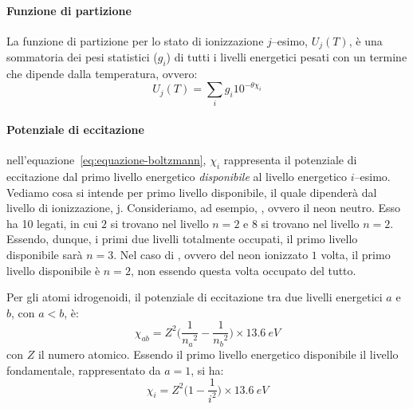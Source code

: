 \paragraph{Funzione di partizione}
La funzione di partizione per lo stato di ionizzazione $j$--esimo, ${U_j}(T)$, è una sommatoria dei pesi statistici ($g_i$) di tutti i livelli energetici pesati con un termine che dipende dalla temperatura, ovvero:
\begin{equation*}
    {U_j}(T) = \sum_i g_i 10^{-\theta \chi_i}
\end{equation*}

\paragraph{Potenziale di eccitazione}
nell'equazione~\eqref{eq:equazione-boltzmann}, $\chi_i$ rappresenta il potenziale di eccitazione dal primo livello energetico \emph{disponibile} al livello energetico $i$--esimo. Vediamo cosa si intende per primo livello disponibile, il quale dipenderà dal livello di ionizzazione, j. Consideriamo, ad esempio, , ovvero il neon neutro. Esso ha 10 legati, in cui $2$ si trovano nel livello $n=2$ e $8$ si trovano nel livello $n=2$. Essendo, dunque, i primi due livelli totalmente occupati, il primo livello disponibile sarà $n=3$. Nel caso di , ovvero del neon ionizzato $1$ volta, il primo livello disponibile è $n=2$, non essendo questa volta occupato del tutto. 

Per gli atomi idrogenoidi, il potenziale di eccitazione tra due livelli energetici $a$ e $b$, con $a<b$, è:
\[
    \chi_{ab} = Z^2 \bigl( \dfrac{1}{{n_a}^2} - \dfrac{1}{{n_b}^2} \bigr) \times \SI{13.6}{eV}
\]
con $Z$ il numero atomico. Essendo il primo livello energetico disponibile il livello fondamentale, rappresentato da $a=1$, si ha:
\[
  \chi_i = Z^2 \bigl( 1-\dfrac{1}{i^2}  \bigr)  \times \SI{13.6}{eV}
\]

